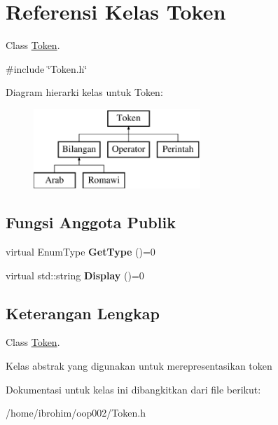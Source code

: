 \hypertarget{classToken}{}\section{Referensi Kelas Token}
\label{classToken}


Class \hyperlink{classToken}{Token}.  




{\ttfamily \#include \char`\"{}Token.\+h\char`\"{}}

Diagram hierarki kelas untuk Token\+:\begin{figure}[H]
\begin{center}
\leavevmode
\includegraphics[height=3.000000cm]{d2/d6e/classToken}
\end{center}
\end{figure}
\subsection*{Fungsi Anggota Publik}
\begin{DoxyCompactItemize}
\item 
\hypertarget{classToken_a86f97e77bdba8277b58ead29d3ef3584}{}virtual Enum\+Type {\bfseries Get\+Type} ()=0\label{classToken_a86f97e77bdba8277b58ead29d3ef3584}

\item 
\hypertarget{classToken_a89fa3f496f16d14fcf4b4f1a4047229b}{}virtual std\+::string {\bfseries Display} ()=0\label{classToken_a89fa3f496f16d14fcf4b4f1a4047229b}

\end{DoxyCompactItemize}


\subsection{Keterangan Lengkap}
Class \hyperlink{classToken}{Token}. 

Kelas abstrak yang digunakan untuk merepresentasikan token 

Dokumentasi untuk kelas ini dibangkitkan dari file berikut\+:\begin{DoxyCompactItemize}
\item 
/home/ibrohim/oop002/Token.\+h\end{DoxyCompactItemize}
